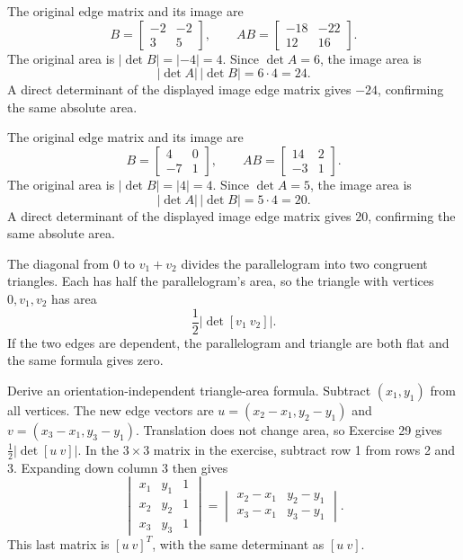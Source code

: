 The original edge matrix and its image are
\[B=\begin{bmatrix}-2&-2\\3&5\end{bmatrix},\qquad AB=\begin{bmatrix}-18&-22\\12&16\end{bmatrix}.\]
The original area is $|\det B|=|-4|=4$. Since $\det A=6$, the image area is
\[|\det A|\,|\det B|=6\cdot4=24.\]
A direct determinant of the displayed image edge matrix gives $-24$, confirming the same absolute area.

The original edge matrix and its image are
\[B=\begin{bmatrix}4&0\\-7&1\end{bmatrix},\qquad AB=\begin{bmatrix}14&2\\-3&1\end{bmatrix}.\]
The original area is $|\det B|=|4|=4$. Since $\det A=5$, the image area is
\[|\det A|\,|\det B|=5\cdot4=20.\]
A direct determinant of the displayed image edge matrix gives $20$, confirming the same absolute area.

The diagonal from $0$ to $v_1+v_2$ divides the parallelogram into two congruent triangles. Each has half the parallelogram's area, so the triangle with vertices $0,v_1,v_2$ has area
\[
\frac12\big|\det[v_1\ v_2]\big|.
\]
If the two edges are dependent, the parallelogram and triangle are both flat and the same formula gives zero.

\goal Derive an orientation-independent triangle-area formula.
Subtract $(x_1,y_1)$ from all vertices. The new edge vectors are $u=(x_2-x_1,y_2-y_1)$ and $v=(x_3-x_1,y_3-y_1)$. Translation does not change area, so Exercise 29 gives $\tfrac12|\det[u\ v]|$.
In the $3\times3$ matrix in the exercise, subtract row 1 from rows 2 and 3. Expanding down column 3 then gives
\[
\begin{vmatrix}x_1&y_1&1\\x_2&y_2&1\\x_3&y_3&1\end{vmatrix}
=\begin{vmatrix}x_2-x_1&y_2-y_1\\x_3-x_1&y_3-y_1\end{vmatrix}.
\]
This last matrix is $[u\ v]^T$, with the same determinant as $[u\ v]$.

